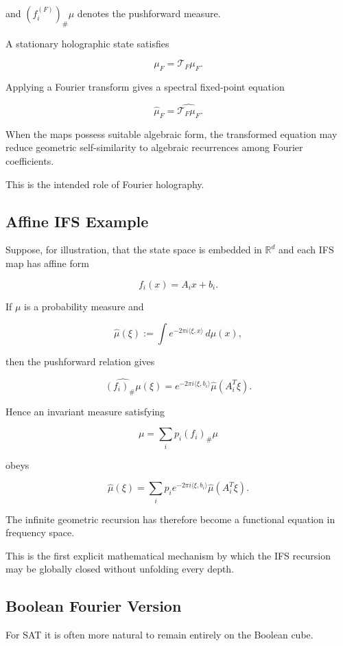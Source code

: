 \documentclass[11pt]{article}
\theoremstyle{plain}
\theoremstyle{definition}
\begin{document}
and \((f_i^{(F)})_\#\mu\) denotes the pushforward measure.

A stationary holographic state satisfies

\[
    \mu_F
    =
    \mathcal{T}_F\mu_F.
\]

Applying a Fourier transform gives a spectral fixed-point equation

\[
\boxed{
\widehat{\mu}_F
=
\widehat{\mathcal{T}_F\mu_F}.
}
\]

When the maps possess suitable algebraic form, the transformed equation may
reduce geometric self-similarity to algebraic recurrences among Fourier
coefficients.

This is the intended role of Fourier holography.

\subsection{Affine IFS Example}

Suppose, for illustration, that the state space is embedded in
\(\mathbb{R}^d\) and each IFS map has affine form

\[
    f_i(x)
    =
    A_i x+b_i.
\]

If \(\mu\) is a probability measure and

\[
    \widehat{\mu}(\xi)
    :=
    \int e^{-2\pi i\langle \xi,x\rangle}\,d\mu(x),
\]

then the pushforward relation gives

\[
    \widehat{(f_i)_\#\mu}(\xi)
    =
    e^{-2\pi i\langle \xi,b_i\rangle}
    \widehat{\mu}(A_i^{T}\xi).
\]

Hence an invariant measure satisfying

\[
    \mu
    =
    \sum_i p_i(f_i)_\#\mu
\]

obeys

\[
\boxed{
\widehat{\mu}(\xi)
=
\sum_i
p_i
e^{-2\pi i\langle \xi,b_i\rangle}
\widehat{\mu}(A_i^{T}\xi).
}
\]

The infinite geometric recursion has therefore become a functional equation
in frequency space.

This is the first explicit mathematical mechanism by which the IFS recursion
may be globally closed without unfolding every depth.

\subsection{Boolean Fourier Version}

For SAT it is often more natural to remain entirely on the Boolean cube.
\end{document}
